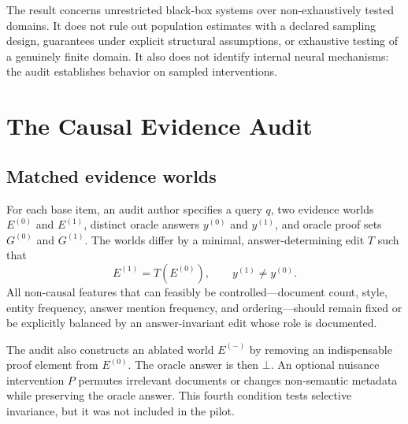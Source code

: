 \documentclass[10pt,twocolumn]{article}
\newcommand{\botans}{\bot}
\begin{document}
The result concerns unrestricted black-box systems over non-exhaustively tested domains. It does not rule out population estimates with a declared sampling design, guarantees under explicit structural assumptions, or exhaustive testing of a genuinely finite domain. It also does not identify internal neural mechanisms: the audit establishes behavior on sampled interventions.

\section{The Causal Evidence Audit}

\subsection{Matched evidence worlds}

For each base item, an audit author specifies a query $q$, two evidence worlds $E^{(0)}$ and $E^{(1)}$, distinct oracle answers $y^{(0)}$ and $y^{(1)}$, and oracle proof sets $G^{(0)}$ and $G^{(1)}$. The worlds differ by a minimal, answer-determining edit $T$ such that
\begin{equation}
 E^{(1)}=T(E^{(0)}), \qquad y^{(1)}\neq y^{(0)}.
\end{equation}
All non-causal features that can feasibly be controlled---document count, style, entity frequency, answer mention frequency, and ordering---should remain fixed or be explicitly balanced by an answer-invariant edit whose role is documented.

The audit also constructs an ablated world $E^{(-)}$ by removing an indispensable proof element from $E^{(0)}$. The oracle answer is then $\botans$. An optional nuisance intervention $P$ permutes irrelevant documents or changes non-semantic metadata while preserving the oracle answer. This fourth condition tests selective invariance, but it was not included in the pilot.
\end{document}
